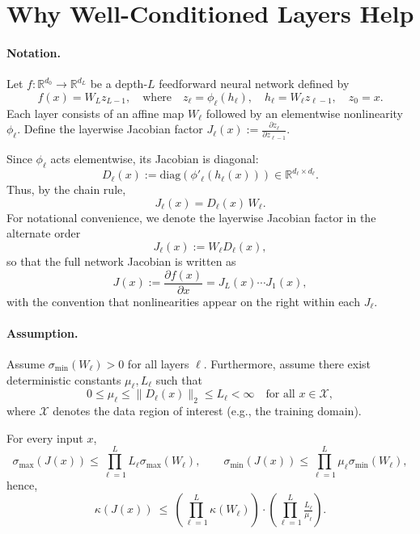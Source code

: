 \documentclass{opt2025}
\begin{document}
\section{Why Well-Conditioned Layers Help}
\paragraph{Notation.}
Let $f: \mathbb{R}^{d_0} \to \mathbb{R}^{d_L}$ be a depth-$L$ feedforward neural network defined by
\[
f(x) = W_L z_{L-1}, \quad \text{where} \quad
z_\ell = \phi_\ell(h_\ell), \quad h_\ell = W_\ell z_{\ell-1}, \quad z_0 = x.
\]
Each layer consists of an affine map $W_\ell$ followed by an elementwise nonlinearity $\phi_\ell$.
Define the layerwise Jacobian factor $J_\ell(x) := \frac{\partial z_\ell}{\partial z_{\ell-1}}$.

Since $\phi_\ell$ acts elementwise, its Jacobian is diagonal:
\[
D_\ell(x) := \mathrm{diag}(\phi'_\ell(h_\ell(x))) \in \mathbb{R}^{d_\ell \times d_\ell}.
\]
Thus, by the chain rule,
\[
J_\ell(x) = D_\ell(x)\,W_\ell.
\]
For notational convenience, we denote the layerwise Jacobian factor in the alternate order
\[
J_\ell(x) := W_\ell D_\ell(x),
\]
so that the full network Jacobian is written as
\[
J(x) := \frac{\partial f(x)}{\partial x}
= J_L(x) \cdots J_1(x),
\]
with the convention that nonlinearities appear on the right within each $J_\ell$.

\paragraph{Assumption.}
Assume $\sigma_{\min}(W_\ell) > 0$ for all layers $\ell$.
Furthermore, assume there exist deterministic constants $\mu_\ell, L_\ell$ such that
\[
0 \le \mu_\ell \le \|D_\ell(x)\|_2 \le L_\ell < \infty
\quad \text{for all } x \in \mathcal{X},
\]
where $\mathcal{X}$ denotes the data region of interest (e.g., the training domain).

\begin{proposition} 
\label{prop:layerwise}
For every input $x$,
\[
\sigma_{\max}(J(x)) \le \prod_{\ell=1}^L L_\ell \sigma_{\max}(W_\ell), \qquad \sigma_{\min}(J(x)) \le \prod_{\ell=1}^L\mu_\ell\sigma_{\min}(W_\ell),
\]
hence,
\[
\boxed{\kappa\left(J(x)\right)\ \le\
\left(\prod_{\ell=1}^{L}\kappa(W_\ell)\right)\cdot
\left(\prod_{\ell=1}^{L}\tfrac{L_\ell}{\mu_\ell}\right)}.
\]
\end{proposition}
\end{document}
